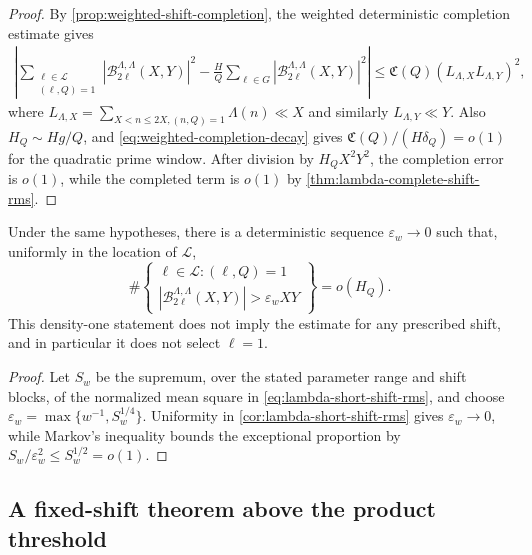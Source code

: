 \begin{proof}
By \cref{prop:weighted-shift-completion}, the weighted deterministic
completion estimate gives
\begin{align*}
 \left|
 \sum_{\substack{\ell\in\mathcal L\\(\ell,Q)=1}}
 |\mathcal B_{2\ell}^{\Lambda,\Lambda}(X,Y)|^2
 -\frac HQ\sum_{\ell\in G}
 |\mathcal B_{2\ell}^{\Lambda,\Lambda}(X,Y)|^2
 \right|
 \le \mathfrak C(Q)(L_{\Lambda,X}L_{\Lambda,Y})^2,
\end{align*}
where
$L_{\Lambda,X}=\sum_{X<n\le2X,(n,Q)=1}\Lambda(n)\ll X$ and similarly
$L_{\Lambda,Y}\ll Y$.  Also $H_Q\sim H g/Q$, and
\eqref{eq:weighted-completion-decay} gives
$\mathfrak C(Q)/(H\delta_Q)=o(1)$ for the quadratic prime window.  After
division by $H_Q X^2Y^2$, the completion error is $o(1)$, while the completed
term is $o(1)$ by \cref{thm:lambda-complete-shift-rms}.
\end{proof}

\begin{corollary}
\label{cor:lambda-density-one-shifts}
Under the same hypotheses, there is a deterministic sequence
$\varepsilon_w\to0$ such that, uniformly in the location of $\mathcal L$,
\begin{equation}
 \#\left\{
  \substack{\ell\in\mathcal L:(\ell,Q)=1\\
  |\mathcal B_{2\ell}^{\Lambda,\Lambda}(X,Y)|
       >\varepsilon_w XY}
 \right\}=o(H_Q).
 \label{eq:lambda-density-one-shifts}
\end{equation}
This density-one statement does not imply the estimate for any prescribed
shift, and in particular it does not select $\ell=1$.
\end{corollary}

\begin{proof}
Let $S_w$ be the supremum, over the stated parameter range and shift blocks,
of the normalized mean square in \eqref{eq:lambda-short-shift-rms}, and choose
$\varepsilon_w=\max\{w^{-1},S_w^{1/4}\}$.  Uniformity in
\cref{cor:lambda-short-shift-rms} gives $\varepsilon_w\to0$, while Markov's
inequality bounds the exceptional proportion by
$S_w/\varepsilon_w^2\le S_w^{1/2}=o(1)$.
\end{proof}

\subsection{A fixed-shift theorem above the product threshold}
\label{subsec:lambda-fixed-shift}

